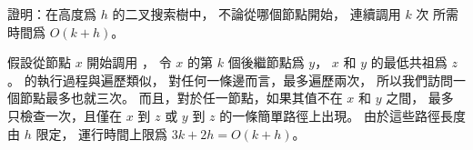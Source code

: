 證明：在高度爲 $h$ 的二叉搜索樹中，
不論從哪個節點開始，
連續調用 $k$ 次  所需時間爲 $O(k+h)$。
\stopEXERCISE

\startANSWER
假設從節點 $x$ 開始調用 ，
令 $x$ 的第 $k$ 個後繼節點爲 $y$，
 $x$ 和 $y$ 的最低共祖爲 $z$。
  的執行過程與遍歷類似，
對任何一條邊而言，最多遍歷兩次，
所以我們訪問一個節點最多也就三次。
而且，對於任一節點，如果其值不在 $x$ 和 $y$ 之間，
最多只檢查一次，且僅在 $x$ 到 $z$ 或 $y$ 到 $z$ 的一條簡單路徑上出現。
由於這些路徑長度由 $h$ 限定，
運行時間上限爲 $3k+2h=O(k+h)$。
\stopANSWER
